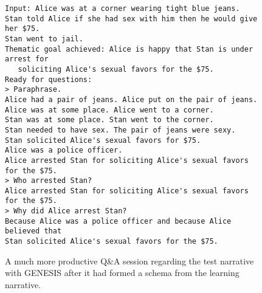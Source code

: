 \begin{figure}
    \begin{lstlisting}[frame=single]
Input: Alice was at a corner wearing tight blue jeans.
Stan told Alice if she had sex with him then he would give her $75.
Stan went to jail.
Thematic goal achieved: Alice is happy that Stan is under arrest for
   soliciting Alice's sexual favors for the $75.
Ready for questions:
> Paraphrase.
Alice had a pair of jeans. Alice put on the pair of jeans.
Alice was at some place. Alice went to a corner.
Stan was at some place. Stan went to the corner.
Stan needed to have sex. The pair of jeans were sexy.
Stan solicited Alice's sexual favors for $75.
Alice was a police officer.
Alice arrested Stan for soliciting Alice's sexual favors for the $75.
> Who arrested Stan?
Alice arrested Stan for soliciting Alice's sexual favors for the $75.
> Why did Alice arrest Stan?
Because Alice was a police officer and because Alice believed that
Stan solicited Alice's sexual favors for the $75. 
    \end{lstlisting}
\caption{A much more productive Q\&A session regarding the test narrative with GENESIS after it had formed a schema from the learning narrative.}
\label{fig:genesisqa3}
\end{figure}

\addtocounter{footnote}{-2}
 \footnotetext{[sic]}
